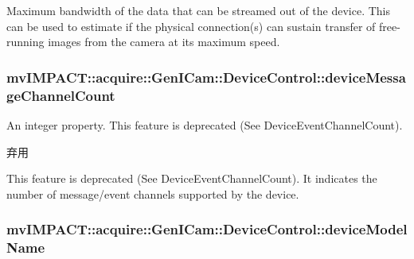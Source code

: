 Maximum bandwidth of the data that can be streamed out of the device. This can be used to estimate if the physical connection(s) can sustain transfer of free-\/running images from the camera at its maximum speed. \hypertarget{classmv_i_m_p_a_c_t_1_1acquire_1_1_gen_i_cam_1_1_device_control_a5e73c3db7079302dfd97230cc3220bc7}{
\subsubsection[{device\+Message\+Channel\+Count}]{ mv\+I\+M\+P\+A\+C\+T\+::acquire\+::\+Gen\+I\+Cam\+::\+Device\+Control\+::device\+Message\+Channel\+Count}}\label{classmv_i_m_p_a_c_t_1_1acquire_1_1_gen_i_cam_1_1_device_control_a5e73c3db7079302dfd97230cc3220bc7}


An integer property. This feature is deprecated (See Device\+Event\+Channel\+Count). 

\begin{DoxyRefDesc}{弃用}
\item[\hyperlink{deprecated__deprecated000038}{弃用}]This feature is deprecated (See Device\+Event\+Channel\+Count). It indicates the number of message/event channels supported by the device. \end{DoxyRefDesc}
\hypertarget{classmv_i_m_p_a_c_t_1_1acquire_1_1_gen_i_cam_1_1_device_control_acff42ebd94b18ac01212b623a8a4812f}{
\subsubsection[{device\+Model\+Name}]{ mv\+I\+M\+P\+A\+C\+T\+::acquire\+::\+Gen\+I\+Cam\+::\+Device\+Control\+::device\+Model\+Name}}\label{classmv_i_m_p_a_c_t_1_1acquire_1_1_gen_i_cam_1_1_device_control_acff42ebd94b18ac01212b623a8a4812f}



